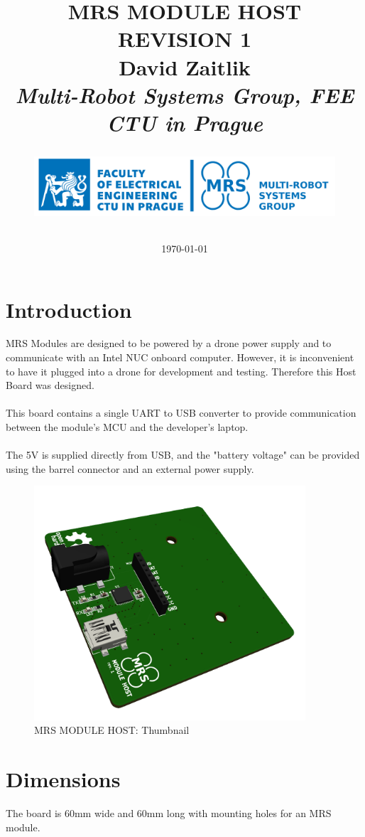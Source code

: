 \documentclass[12pt, a4paper]{article}
\title{
\Huge{MRS MODULE HOST}\\
{REVISION 1}\\
\vspace{0.5cm}
\LARGE{David Zaitlik}\\
\vspace{0.5cm}
\normalsize{\textit{Multi-Robot Systems Group, FEE CTU in Prague}}\\
\vspace{1.5cm}
\vfill
\begin{figure}[h]
\centering
\includegraphics[width=\textwidth]{figures/logo_CTU_FEE_MRS_blue.png}
\end{figure}
\date{\today}

}
\begin{document}
\clearpage
\maketitle
\thispagestyle{empty}

\pagebreak
\tableofcontents
\listoffigures
\listoftables
\thispagestyle{empty}

\pagebreak
\setcounter{page}{1}
\section{Introduction}
MRS Modules are designed to be powered by a drone power supply and to communicate with an Intel NUC onboard computer. However, it is inconvenient to have it plugged into a drone for development and testing. Therefore this Host Board was designed.\\
\\
This board contains a single UART to USB converter to provide communication between the module's MCU and the developer's laptop.\\
\\
The 5V is supplied directly from USB, and the "battery voltage" can be provided using the barrel connector and an external power supply.

\begin{figure}[h]
\centering
\includegraphics[width=0.9\textwidth]{figures/Thumbnail.png}
\caption{MRS MODULE HOST: Thumbnail}
\label{fig:thumbnail}
\end{figure}

\pagebreak
\section{Dimensions}
The board is 60mm wide and 60mm long with mounting holes for an MRS module.
\end{document}
